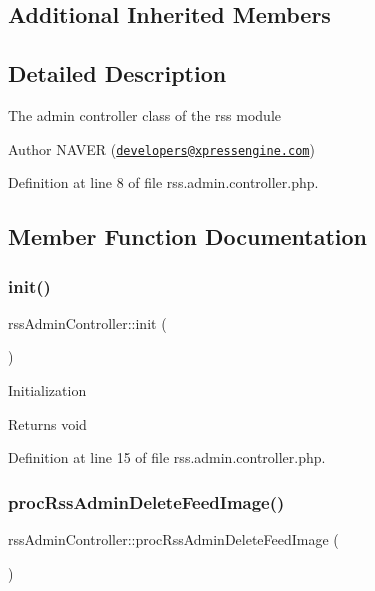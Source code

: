 \subsection*{Additional Inherited Members}


\subsection{Detailed Description}
The admin controller class of the rss module

\begin{DoxyAuthor}{Author}
N\+A\+V\+ER (\href{mailto:developers@xpressengine.com}{\tt developers@xpressengine.\+com}) 
\end{DoxyAuthor}


Definition at line 8 of file rss.\+admin.\+controller.\+php.



\subsection{Member Function Documentation}
\mbox{\label{classrssAdminController_ad73e127c3d6191b7d82e2fd3f50ef477}} 
\subsubsection{\texorpdfstring{init()}{init()}}
{\footnotesize\ttfamily rss\+Admin\+Controller\+::init (\begin{DoxyParamCaption}{ }\end{DoxyParamCaption})}

Initialization

\begin{DoxyReturn}{Returns}
void 
\end{DoxyReturn}


Definition at line 15 of file rss.\+admin.\+controller.\+php.

\mbox{\label{classrssAdminController_a37eed33f761ae0a1cdcce49562bed601}} 
\subsubsection{\texorpdfstring{proc\+Rss\+Admin\+Delete\+Feed\+Image()}{procRssAdminDeleteFeedImage()}}
{\footnotesize\ttfamily rss\+Admin\+Controller\+::proc\+Rss\+Admin\+Delete\+Feed\+Image (\begin{DoxyParamCaption}{ }\end{DoxyParamCaption})}



